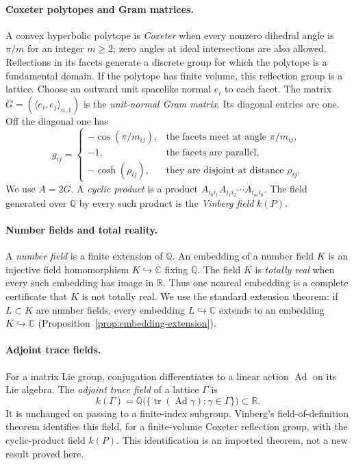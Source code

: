 \documentclass[11pt]{article}
\numberwithin{equation}{section}
\theoremstyle{definition}
\theoremstyle{remark}
\newcommand{\Q}{\mathbb{Q}}
\newcommand{\R}{\mathbb{R}}
\newcommand{\C}{\mathbb{C}}
\newcommand{\tr}{\operatorname{tr}}
\newcommand{\Ad}{\operatorname{Ad}}
\begin{document}
\paragraph{Coxeter polytopes and Gram matrices.}
A convex hyperbolic polytope is \emph{Coxeter} when every nonzero dihedral
angle is \(\pi/m\) for an integer \(m\ge2\); zero angles at ideal intersections
are also allowed.  Reflections in its facets generate a
discrete group for which the polytope is a fundamental domain.  If the
polytope has finite volume, this reflection group is a lattice.  Choose an
outward unit spacelike normal \(e_i\) to each facet.  The matrix
\(G=(\langle e_i,e_j\rangle_{n,1})\) is the \emph{unit-normal Gram matrix}.
Its diagonal entries are one.  Off the diagonal one has
\[
 g_{ij}=
 \begin{cases}
 -\cos(\pi/m_{ij}),&\text{the facets meet at angle }\pi/m_{ij},\\
 -1,&\text{the facets are parallel},\\
 -\cosh(\rho_{ij}),&\text{they are disjoint at distance }\rho_{ij}.
 \end{cases}
\]
We use \(A=2G\).  A \emph{cyclic product} is a product
\(A_{i_0i_1}A_{i_1i_2}\cdots A_{i_mi_0}\).  The field generated over \(\Q\)
by every such product is the \emph{Vinberg field} \(k(P)\).

\paragraph{Number fields and total reality.}
A \emph{number field} is a finite extension of \(\Q\).  An embedding of a
number field \(K\) is an injective field homomorphism \(K\hookrightarrow\C\)
fixing \(\Q\).  The field \(K\) is \emph{totally real} when every such
embedding has image in \(\R\).  Thus one nonreal embedding is a complete
certificate that \(K\) is not totally real.  We use the standard extension
theorem: if \(L\subset K\) are number fields, every embedding
\(L\hookrightarrow\C\) extends to an embedding \(K\hookrightarrow\C\)
(Proposition~\ref{prop:embedding-extension}).

\paragraph{Adjoint trace fields.}
For a matrix Lie group, conjugation differentiates to a linear action
\(\Ad\) on its Lie algebra.  The \emph{adjoint trace field} of a lattice
\(\Gamma\) is
\[
 k(\Gamma)=
 \Q\bigl(\{\tr(\Ad\gamma):\gamma\in\Gamma\}\bigr)\subset\R.
\]
It is unchanged on passing to a finite-index subgroup.  Vinberg's
field-of-definition theorem identifies this field, for a finite-volume
Coxeter reflection group, with the cyclic-product field \(k(P)\).  This
identification is an imported theorem, not a new result proved here.
\end{document}
